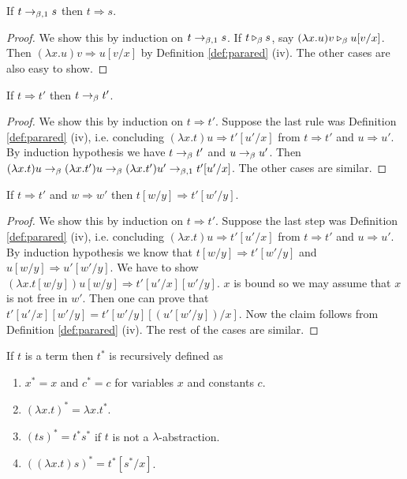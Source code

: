 \begin{boxlem} \label{lem:beoredtoarrow}
    If $t \to_{\beta, 1} s$ then $t \Rightarrow s$.
\end{boxlem}
\begin{proof}
    We show this by induction on $t \to_{\beta, 1} s$.
    If $t \triangleright_{\beta} s$, say $(\lambda x.u)v \triangleright_{\beta} u [v/x]$.
    Then $(\lambda x. u)v \Rightarrow u [v/x]$ by Definition \ref{def:parared} (iv).
    The other cases are also easy to show.
\end{proof}

\begin{boxlem} \label{lem:arrowbered}
    If $t \Rightarrow t'$ then $t \to_{\beta} t'$.
\end{boxlem}
\begin{proof}
    We show this by induction on $t \Rightarrow t'$.
    Suppose the last rule was Definition \ref{def:parared} (iv), i.e. concluding $(\lambda x.t)u \Rightarrow t'[u'/x]$ from $t \Rightarrow t'$ and $u \Rightarrow u'$.
    By induction hypothesis we have $t \to_{\beta} t'$ and $u \to_{\beta} u'$.
    Then $(\lambda x.t)u \to_{\beta} (\lambda x.t') u \to_{\beta} (\lambda x. t') u' \to_{\beta, 1} t'[u'/x]$.
    The other cases are similar.
\end{proof}

\begin{boxlem} \label{lem:arrowsubst}
    If $t \Rightarrow t'$ and $w \Rightarrow w'$ then $t[w/y] \Rightarrow t'[w'/y]$.
\end{boxlem}
\begin{proof}
    We show this by induction on $t \Rightarrow t'$.
    Suppose the last step was Definition \ref{def:parared} (iv), i.e. concluding $(\lambda x.t)u \Rightarrow t'[u'/x]$ from $t \Rightarrow t'$ and $u \Rightarrow u'$.
    By induction hypothesis we know that $t[w/y] \Rightarrow t'[w'/y]$ and $u[w /y] \Rightarrow u'[w'/y]$.
    We have to show $(\lambda x.t [w/y])u[w/y] \Rightarrow t'[u'/x][w'/y]$.
    $x$ is bound so we may assume that $x$ is not free in $w'$.
    Then one can prove that $t'[u'/x][w'/y] = t'[w'/y][(u'[w'/y])/x]$.
    Now the claim follows from Definition \ref{def:parared} (iv).
    The rest of the cases are similar.
\end{proof}

\begin{boxdefi} \label{def:star}
    If $t$ is a term then \alert{$t^*$} is recursively defined as
    \begin{enumerate}
        \item $x^* = x$ and $c^* = c$ for variables $x$ and constants $c$.
        \item $(\lambda x.t)^* = \lambda x. t^*$.
        \item $(ts)^* = t^*s^*$ if $t$ is not a $\lambda$-abstraction.
        \item $((\lambda x.t) s)^* = t^*[s^*/x]$.
    \end{enumerate}
\end{boxdefi}

